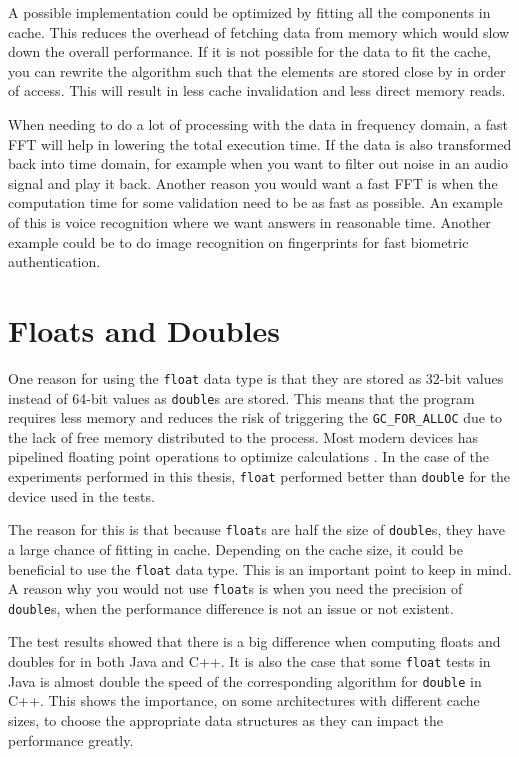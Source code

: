 A possible implementation could be optimized by fitting all the components in cache. This reduces the overhead of fetching data from memory which would slow down the overall performance. If it is not possible for the data to fit the cache, you can rewrite the algorithm such that the elements are stored close by in order of access. This will result in less cache invalidation and less direct memory reads.

When needing to do a lot of processing with the data in frequency domain, a fast FFT will help in lowering the total execution time. If the data is also transformed back into time domain, for example when you want to filter out noise in an audio signal and play it back. Another reason you would want a fast FFT is when the computation time for some validation need to be as fast as possible. An example of this is voice recognition where we want answers in reasonable time. Another example could be to do image recognition on fingerprints for fast biometric authentication.

\section{Floats and Doubles}
One reason for using the \texttt{float} data type is that they are stored as 32-bit values instead of 64-bit values as \texttt{double}s are stored. This means that the program requires less memory and reduces the risk of triggering the \texttt{GC\_FOR\_ALLOC} due to the lack of free memory distributed to the process. Most modern devices has pipelined floating point operations to optimize calculations \cite{android:float}. In the case of the experiments performed in this thesis, \texttt{float} performed better than \texttt{double} for the device used in the tests.

The reason for this is that because \texttt{float}s are half the size of \texttt{double}s, they have a large chance of fitting in cache. Depending on the cache size, it could be beneficial to use the \texttt{float} data type. This is an important point to keep in mind. A reason why you would not use \texttt{float}s is when you need the precision of \texttt{double}s, when the performance difference is not an issue or not existent.

The test results showed that there is a big difference when computing floats and doubles for in both Java and C++. It is also the case that some \texttt{float} tests in Java is almost double the speed of the corresponding algorithm for \texttt{double} in C++. This shows the importance, on some architectures with different cache sizes, to choose the appropriate data structures as they can impact the performance greatly.
